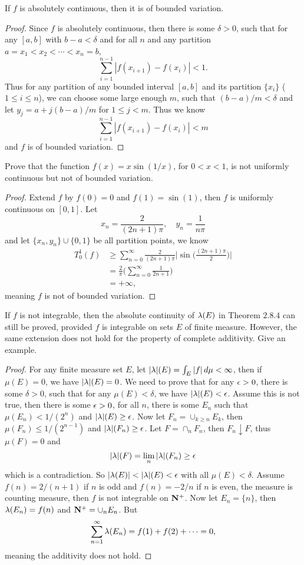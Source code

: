 \begin{pro}%
	If $f$ is absolutely continuous, then it is of bounded variation.
\end{pro}
\begin{proof}
	Since $f$ is absolutely continuous, then there is some $\delta>0$, such that for any $[a,b]$ with $b-a<\delta$ and 
	for all $n$ and any partition $a=x_1<x_2<\cdots<x_n=b$,
	\[\sum_{i=1}^{n-1} |f(x_{i+1})-f(x_{i})|<1.\]
	Thus for any partition of any bounded interval $[a,b]$ and its partition $\{x_i\}$ ($1\leq i\leq n$), we can choose some large enough $m$, such that $(b-a)/m<\delta$ and let $y_{j}=a+j(b-a)/m$ for $1\leq j<m$. Thus we know
	\[\sum_{i=1}^{n-1} |f(x_{i+1})-f(x_{i})|<m\]
	and $f$ is of bounded variation.
\end{proof}

\begin{pro}%
	Prove that the function $f(x)=x\sin(1/x)$, for $0<x<1$, is not uniformly continuous but not of bounded variation.
\end{pro}
\begin{proof}
	Extend $f$ by $f(0)=0$ and $f(1)=\sin(1)$, then $f$ is uniformly continuous on $[0,1]$. Let
	\[x_n=\frac{2}{(2n+1)\pi},\quad y_n=\frac{1}{n\pi}\]
	and let $\{x_n,y_n\}\cup\{0,1\}$ be all partition points, we know
	\begin{align*}
	T_0^1(f)&\geq \sum_{n=0}^{\infty} \frac{2}{(2n+1)\pi}\bigg|\sin\Big(\frac{(2n+1)\pi}{2}\Big)\bigg|\\
	&=\frac{2}{\pi}\bigg(\sum_{n=0}^{\infty} \frac{1}{2n+1}\bigg)\\
	&=+\infty,
	\end{align*}meaning $f$ is not of bounded variation.
\end{proof}

\begin{pro}%
	If $f$ is not integrable, then the absolute continuity of $\lambda(E)$ in Theorem $2.8.4$ can still be proved, provided $f$ is integrable on sets $E$ of finite measure. However, the same extension does not hold for the property of complete additivity. Give an example.
\end{pro}
\begin{proof}
	For any finite measure set $E$, let $|\lambda|(E)=\int_E |f|\,d\mu<\infty$, then if $\mu(E)=0$, we have $|\lambda|(E)=0$.
	We need to prove that for any $\epsilon>0$, there is some $\delta>0$, such that for any $\mu(E)<\delta$, we have $|\lambda|(E)<\epsilon$. Assume this is not true, then there is some $\epsilon>0$, for all $n$, there is some $E_n$ such that $\mu(E_n)<1/(2^n)$ and $|\lambda|(E)\geq \epsilon$. Now let $F_n=\cup_{k\geq n}E_k$, then $\mu(F_n)\leq 1/(2^{n-1})$ and $|\lambda|(F_n)\geq \epsilon$.
	Let $F=\cap_{n} F_n$, then $F_n\downarrow F$, thus $\mu(F)=0$ and
	\[|\lambda|(F)=\lim_n|\lambda|(F_n)\geq \epsilon\]
	which is a contradiction. So $|\la(E)|<|\la|(E)<\ep$ with all $\mu(E)<\delta$.
	Assume $f(n)=2/(n+1)$ if $n$ is odd and $f(n)=-2/n$ if $n$ is even, the measure is counting measure, then $f$ is not integrable on $\mathbf{N}^+$. Now let $E_n=\{n\}$, then $\lambda(E_n)=f(n)$ and $\mathbf{N}^+=\cup_n E_n$. But 
	\[\sum_{n=1}^\infty \lambda(E_n)=f(1)+f(2)+\cdots=0,\] meaning the additivity does not hold.
\end{proof}

